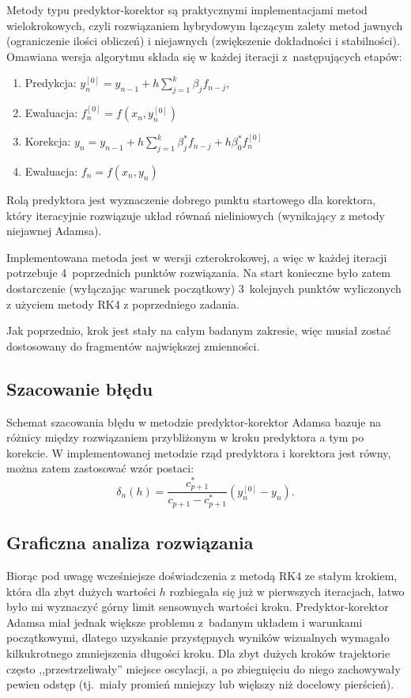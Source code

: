 \documentclass[12pt]{article}
\begin{document}
Metody typu predyktor-korektor są praktycznymi implementacjami metod wielokrokowych, czyli rozwiązaniem hybrydowym łączącym zalety metod jawnych (ograniczenie ilości obliczeń) i niejawnych (zwiększenie dokładności i stabilności). Omawiana wersja algorytmu składa się w każdej iteracji z~następujących etapów:
\begin{enumerate}
    \item Predykcja: \( y_n^{[0]} = y_{n-1} + h \sum_{j=1}^k\beta_j f_{n-j} \),
    \item Ewaluacja: \( f_n^{[0]} = f(x_n, y_n^{[0]}) \)
    \item Korekcja: \( y_n = y_{n-1} + h \sum_{j=1}^k\beta_j^* f_{n-j} + h \beta_0^* f_n^{[0]} \)
    \item Ewaluacja: \( f_n = f(x_n, y_n) \)
\end{enumerate}

Rolą predyktora jest wyznaczenie dobrego punktu startowego dla korektora, który iteracyjnie rozwiązuje układ równań nieliniowych (wynikający z metody niejawnej Adamsa).

Implementowana metoda jest w wersji czterokrokowej, a więc w każdej iteracji potrzebuje 4~poprzednich punktów rozwiązania. Na start konieczne było zatem dostarczenie (wyłączając warunek początkowy) 3~kolejnych punktów wyliczonych z użyciem metody RK4 z poprzedniego zadania.

Jak poprzednio, krok jest stały na całym badanym zakresie, więc musiał zostać dostosowany do fragmentów największej zmienności.

\subsection{Szacowanie błędu}
Schemat szacowania błędu w metodzie predyktor-korektor Adamsa bazuje na różnicy między rozwiązaniem przybliżonym w kroku predyktora a tym po korekcie. W implementowanej metodzie rząd predyktora i korektora jest równy, można zatem zastosować wzór postaci:
\[ \delta_n(h) = \frac{c_{p+1}^*}{c_{p+1} - c_{p+1}^*} (y_n^{[0]} - y_n) \text{.}\]

\subsection{Graficzna analiza rozwiązania}
Biorąc pod uwagę wcześniejsze doświadczenia z metodą RK4 ze stałym krokiem, która dla zbyt dużych wartości \( h \) rozbiegała się już w pierwszych iteracjach, łatwo było mi wyznaczyć górny limit sensownych wartości kroku. Predyktor-korektor Adamsa miał jednak większe problemu z~badanym układem i warunkami początkowymi, dlatego uzyskanie przystępnych wyników wizualnych wymagało kilkukrotnego zmniejszenia długości kroku. Dla zbyt dużych kroków trajektorie często ,,przestrzeliwały'' miejsce oscylacji, a po zbiegnięciu do niego zachowywały pewien odstęp (tj.~miały promień mniejszy lub większy niż docelowy pierścień).
\end{document}
